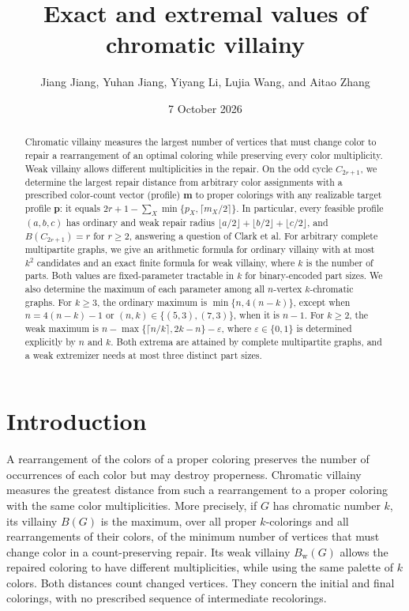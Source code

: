 \documentclass[11pt,reqno]{amsart}
\title[Exact and extremal chromatic villainy]{Exact and extremal values of chromatic villainy}
\author[Jiang, Jiang, Li, Wang, and Zhang]{Jiang Jiang, Yuhan Jiang, Yiyang Li, Lujia Wang, and Aitao Zhang}
\date{7 October 2026}
\numberwithin{equation}{section}
\theoremstyle{definition}
\theoremstyle{remark}
\begin{document}
\begin{abstract}
Chromatic villainy measures the largest number of vertices that must
change color to repair a rearrangement of an optimal coloring while
preserving every color multiplicity. Weak villainy allows different
multiplicities in the repair. On the odd cycle $C_{2r+1}$, we determine
the largest repair distance from arbitrary color assignments with a
prescribed color-count vector (profile) $\mathbf m$ to proper colorings
with any realizable target profile $\mathbf p$: it equals
$2r+1-\sum_X\min\{p_X,\lceil m_X/2\rceil\}$.
In particular, every feasible profile $(a,b,c)$ has ordinary and weak
repair radius $\lfloor a/2\rfloor+\lfloor b/2\rfloor+\lfloor c/2\rfloor$,
and $B(C_{2r+1})=r$ for $r\ge2$, answering a question of Clark et al.
For arbitrary complete multipartite graphs, we give an arithmetic
formula for ordinary villainy with at most $k^2$ candidates and an exact
finite formula for weak villainy, where $k$ is the number of parts.
Both values are fixed-parameter tractable in $k$ for binary-encoded
part sizes. We also determine the maximum of each parameter among all
$n$-vertex $k$-chromatic graphs. For $k\ge3$, the ordinary maximum is
$\min\{n,4(n-k)\}$, except when $n=4(n-k)-1$ or
$(n,k)\in\{(5,3),(7,3)\}$, when it is $n-1$.
For $k\ge2$, the weak maximum is
$n-\max\{\lceil n/k\rceil,2k-n\}-\varepsilon$, where
$\varepsilon\in\{0,1\}$ is determined explicitly by $n$ and $k$.
Both extrema are attained by complete multipartite graphs, and a weak
extremizer needs at most three distinct part sizes.
\end{abstract}
\maketitle
\section{Introduction}

A rearrangement of the colors of a proper coloring preserves the number
of occurrences of each color but may destroy properness. Chromatic
villainy measures the greatest distance from such a rearrangement to a
proper coloring with the same color multiplicities. More precisely, if
$G$ has chromatic number $k$, its villainy $B(G)$ is the maximum, over
all proper $k$-colorings and all rearrangements of their colors, of the
minimum number of vertices that must change color in a count-preserving
repair. Its weak villainy $B_{\mathrm w}(G)$ allows the repaired
coloring to have different multiplicities, while using the same palette
of $k$ colors. Both distances count changed vertices. They concern the
initial and final colorings, with no prescribed sequence of intermediate
recolorings.
\end{document}
